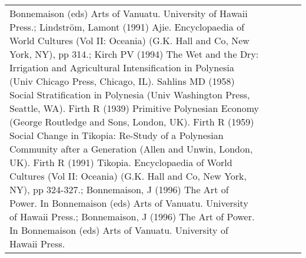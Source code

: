\begin{longtable}{p{1.8cm}p{1.8cm}p{1.8cm}p{2cm}p{7cm}}
Bonnemaison (eds) Arts of Vanuatu. University of Hawaii Press.; Lindström, Lamont (1991) Ajie. Encyclopaedia of World Cultures (Vol II: Oceania) (G.K. Hall and Co, New York, NY), pp 314.; Kirch PV (1994) The Wet and the Dry: Irrigation and Agricultural Intensification in Polynesia (Univ Chicago Press, Chicago, IL). Sahlins MD (1958) Social Stratification in Polynesia (Univ Washington Press, Seattle, WA). Firth R (1939) Primitive Polynesian Economy (George Routledge and Sons, London, UK). Firth R (1959) Social Change in Tikopia: Re-Study of a Polynesian Community after a Generation (Allen and Unwin, London, UK). Firth R (1991) Tikopia. Encyclopaedia of World Cultures (Vol II: Oceania) (G.K. Hall and Co, New York, NY), pp 324-327.; Bonnemaison, J (1996) The Art of Power. In Bonnemaison (eds) Arts of Vanuatu. University of Hawaii Press.; Bonnemaison, J (1996) The Art of Power. In Bonnemaison (eds) Arts of Vanuatu. University of Hawaii Press. \\ 

\end{longtable}
